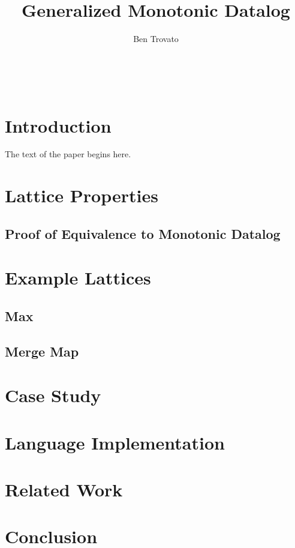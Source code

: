 \documentclass{vldb}
\begin{document}
\title{Generalized Monotonic Datalog}


\author{
\alignauthor
Ben Trovato\\
       \\
       \\
       \\
}

\maketitle

\begin{abstract}
\end{abstract}

\section{Introduction}
The text of the paper begins here.\cite{Alvaro2011}

\section{Lattice Properties}

\subsection{Proof of Equivalence to Monotonic Datalog}

\section{Example Lattices}

\subsection{Max}

\subsection{Merge Map}

\section{Case Study}

\section{Language Implementation}

\section{Related Work}

\section{Conclusion}



\end{document}
